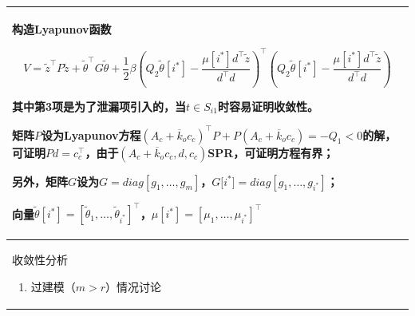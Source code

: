 \documentclass[
  12pt,
  a4paper
]{article}
\begin{document}
\begin{longtable}[]{@{}
  >{\raggedright\arraybackslash}p{}@{}}
\toprule\noalign{}
\begin{minipage}[b]{\linewidth}\raggedright
构造Lyapunov函数

\[V = {\widetilde{z}}^{\top}P\widetilde{z} + {\widetilde{\theta}}^{\top}G\widetilde{\theta} + \frac{1}{2}\beta\left( Q_{2}\widetilde{\theta}\left\lbrack i^{*} \right\rbrack - \frac{\mu\left\lbrack i^{*} \right\rbrack d^{\top}\widetilde{z}}{d^{\top}d} \right)^{\top}\left( Q_{2}\widetilde{\theta}\left\lbrack i^{*} \right\rbrack - \frac{\mu\left\lbrack i^{*} \right\rbrack d^{\top}\widetilde{z}}{d^{\top}d} \right)\]

其中第3项是为了泄漏项引入的，当\(t \in S_{i1}\)时容易证明收敛性。

矩阵\(P\)设为Lyapunov方程\(\left( A_{c} + {\overline{k}}_{o}c_{c} \right)^{\top}P + P\left( A_{c} + {\overline{k}}_{o}c_{c} \right) = - Q_{1} < 0\)的解，可证明\(Pd = c_{c}^{\top}\)，由于\((A_{c} + {\overline{k}}_{o}c_{c},d,c_{c})\)SPR，可证明方程有界；

另外，矩阵\(G\)设为\(G = diag\left\lbrack g_{1},\ldots,g_{m} \right\rbrack\)，\(G\lbrack i^{*}\rbrack = diag\left\lbrack g_{1},\ldots,g_{i^{*}} \right\rbrack\)；

向量\(\widetilde{\theta}\left\lbrack i^{*} \right\rbrack = \left\lbrack {\widetilde{\theta}}_{1},\ldots,{\widetilde{\theta}}_{i^{*}} \right\rbrack^{\top}\)，\(\mu\left\lbrack i^{*} \right\rbrack = \left\lbrack \mu_{1},\ldots,\mu_{i^{*}} \right\rbrack^{\top}\)
\end{minipage} \\
\midrule\noalign{}
\endhead
\bottomrule\noalign{}
\endlastfoot
\begin{minipage}[t]{\linewidth}\raggedright
收敛性分析

\begin{enumerate}
\def\labelenumi{\arabic{enumi}.}
\item
  过建模（\(m > r\)）情况讨论
\end{enumerate}


\end{minipage}
\end{longtable}
\end{document}
